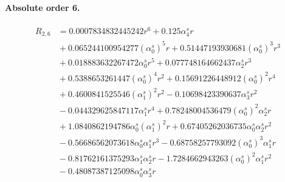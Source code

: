 \documentclass[10pt]{article}
\begin{document}
\paragraph{Absolute order 6.}
\begin{align*}
R_{2,6} &= 0.0007834832445242 r^{6} + 0.125 \alpha_{4}^s r \\
&{}  + 0.065244100954277 \left(\alpha_{0}^s\right)^{5} r + 0.51447193930681 \left(\alpha_{0}^s\right)^{3} r^{3} \\
&{}  + 0.018883632267472 \alpha_{0}^s r^{5} + 0.077748164662437 \alpha_{2}^s r^{3} \\
&{}  + 0.5388653261447 \left(\alpha_{0}^s\right)^{4} r^{2} + 0.15691226448912 \left(\alpha_{0}^s\right)^{2} r^{4} \\
&{}  + 0.4600841525546 \left(\alpha_{1}^s\right)^{2} r^{2} - 0.10698423390637 \alpha_{3}^s r^{2} \\
&{}  - 0.044329625847117 \alpha_{1}^s r^{4} + 0.78248004536479 \left(\alpha_{0}^s\right)^{2} \alpha_{2}^s r \\
&{}  + 1.0840862194786 \alpha_{0}^s \left(\alpha_{1}^s\right)^{2} r + 0.67405262036735 \alpha_{0}^s \alpha_{2}^s r^{2} \\
&{}  - 0.56686562073618 \alpha_{0}^s \alpha_{1}^s r^{3} - 0.68758257793092 \left(\alpha_{0}^s\right)^{3} \alpha_{1}^s r \\
&{}  - 0.81762161375293 \alpha_{1}^s \alpha_{2}^s r - 1.7284662943263 \left(\alpha_{0}^s\right)^{2} \alpha_{1}^s r^{2} \\
&{}  - 0.48087387125098 \alpha_{0}^s \alpha_{3}^s r
\end{align*}
\end{document}
